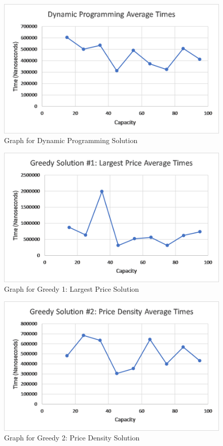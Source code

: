 \documentclass[onecolumn, letterpaper, 12pt]{article}
\begin{document}
\begin{figure}[H]
\centering
\includegraphics[width=0.8\linewidth]{./dynamicProgramming.png}
\caption{Graph for  Dynamic Programming Solution}
\label{fig:dpGraph}
\end{figure}

\begin{figure}[H]
\centering
\includegraphics[width=0.8\linewidth]{./largestPrice.png}
\caption{Graph for Greedy 1: Largest Price Solution}
\label{fig:largestPriceGraph}
\end{figure}

\begin{figure}[H]
\centering
\includegraphics[width=0.8\linewidth]{./priceDensity.png}
\caption{Graph for  Greedy 2: Price Density Solution}
\label{fig:priceDensityGraph}
\end{figure}
\end{document}
